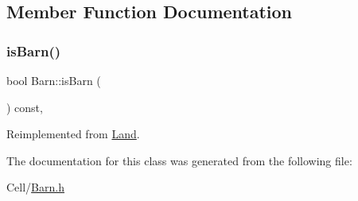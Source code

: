 \subsection{Member Function Documentation}
\mbox{\label{classBarn_a716f3e1ecf4d4d37fe934d29425841a1}} 
\subsubsection{\texorpdfstring{isBarn()}{isBarn()}}
{\footnotesize\ttfamily bool Barn\+::is\+Barn (\begin{DoxyParamCaption}{ }\end{DoxyParamCaption}) const\hspace{0.3cm}{\ttfamily [inline]}, {\ttfamily [virtual]}}



Reimplemented from \mbox{\hyperlink{classLand_a0e7a4fa66fb495bada48ac00974bf5a7}{Land}}.



The documentation for this class was generated from the following file\+:\begin{DoxyCompactItemize}
\item 
Cell/\mbox{\hyperlink{Barn_8h}{Barn.\+h}}\end{DoxyCompactItemize}
